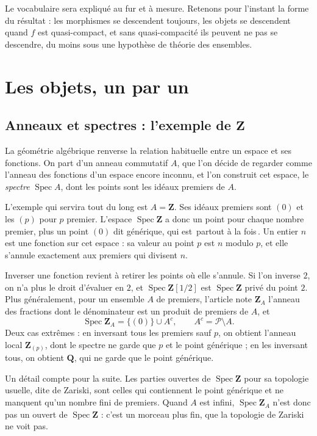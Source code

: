 \documentclass[11pt,a4paper]{amsart}
\theoremstyle{definition}
\theoremstyle{plain}
\theoremstyle{remark}
\newcommand{\Z}{\mathbf Z}
\newcommand{\Q}{\mathbf Q}
\newcommand{\Pp}{\mathcal P}
\newcommand{\Spec}{\operatorname{Spec}}
\begin{document}
Le vocabulaire sera expliqué au fur et à mesure. Retenons pour l'instant la forme du résultat : les morphismes se descendent toujours, les objets se descendent quand $f$ est quasi-compact, et sans quasi-compacité ils peuvent ne pas se descendre, du moins sous une hypothèse de théorie des ensembles.

\section{Les objets, un par un}

\subsection{Anneaux et spectres : l'exemple de $\Z$}

La géométrie algébrique renverse la relation habituelle entre un espace et ses fonctions. On part d'un anneau commutatif $A$, que l'on décide de regarder comme l'anneau des fonctions d'un espace encore inconnu, et l'on construit cet espace, le \emph{spectre} $\Spec A$, dont les points sont les idéaux premiers de $A$.

L'exemple qui servira tout du long est $A=\Z$. Ses idéaux premiers sont $(0)$ et les $(p)$ pour $p$ premier. L'espace $\Spec\Z$ a donc un point pour chaque nombre premier, plus un point $(0)$ dit générique, qui est \guillemotleft\,partout à la fois\,\guillemotright{}. Un entier $n$ est une fonction sur cet espace : sa valeur au point $p$ est $n$ modulo $p$, et elle s'annule exactement aux premiers qui divisent $n$.

Inverser une fonction revient à retirer les points où elle s'annule. Si l'on inverse $2$, on n'a plus le droit d'évaluer en $2$, et $\Spec\Z[1/2]$ est $\Spec\Z$ privé du point $2$. Plus généralement, pour un ensemble $A$ de premiers, l'article note $\Z_A$ l'anneau des fractions dont le dénominateur est un produit de premiers de $A$, et
\[
\Spec\Z_A=\{(0)\}\cup A^c,\qquad A^c=\Pp\setminus A .
\]
Deux cas extrêmes : en inversant tous les premiers sauf $p$, on obtient l'anneau local $\Z_{(p)}$, dont le spectre ne garde que $p$ et le point générique ; en les inversant tous, on obtient $\Q$, qui ne garde que le point générique.

Un détail compte pour la suite. Les parties ouvertes de $\Spec\Z$ pour sa topologie usuelle, dite de Zariski, sont celles qui contiennent le point générique et ne manquent qu'un nombre fini de premiers. Quand $A$ est infini, $\Spec\Z_A$ n'est donc pas un ouvert de $\Spec\Z$ : c'est un morceau plus fin, que la topologie de Zariski ne voit pas.
\end{document}
